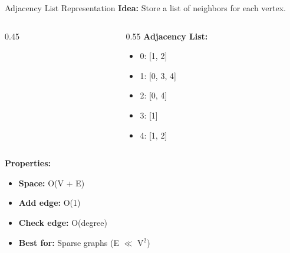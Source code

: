 \documentclass[aspectratio=169]{beamer}
\begin{document}
\begin{frame}{Adjacency List Representation}
  \textbf{Idea:} Store a list of neighbors for each vertex.

  \vspace{0.3cm}
  \begin{columns}[T]
    \begin{column}{0.45\textwidth}
      \begin{center}
      \end{center}
    \end{column}

    \begin{column}{0.55\textwidth}
      \textbf{Adjacency List:}
      \begin{itemize}
        \item 0: [1, 2]
        \item 1: [0, 3, 4]
        \item 2: [0, 4]
        \item 3: [1]
        \item 4: [1, 2]
      \end{itemize}
    \end{column}
  \end{columns}

  \vspace{0.3cm}
  \textbf{Properties:}
  \begin{itemize}
    \item \textbf{Space:} O(V + E)
    \item \textbf{Add edge:} O(1)
    \item \textbf{Check edge:} O(degree)
    \item \textbf{Best for:} Sparse graphs (E $\ll$ V$^2$)
  \end{itemize}
\end{frame}
\end{document}
